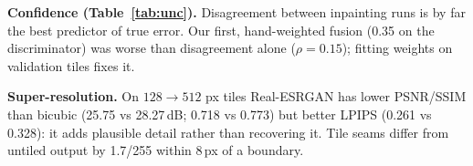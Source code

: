 \documentclass[11pt,a4paper,twocolumn]{article}
\begin{document}
\begin{table}[h]
\centering
\small
{}
\caption{De-fading on 100 simulated faded tiles (lower is better); ``healthy'' = unfaded tiles after the model (ideal 0).}
\label{tab:col}
\end{table}

\textbf{Confidence (Table~\ref{tab:unc}).} Disagreement between inpainting runs is by far the best predictor of true error. Our first, hand-weighted fusion (0.35 on the discriminator) was worse than disagreement alone ($\rho=0.15$); fitting weights on validation tiles fixes it.

\begin{table}[h]
\centering
\small
{}
\caption{Does a signal predict the true repair error (AUROC for error $>25/255$)?}
\label{tab:unc}
\end{table}

\textbf{Super-resolution.} On $128\!\to\!512$ px tiles Real-ESRGAN has lower PSNR/SSIM than bicubic (25.75 vs 28.27\,dB; 0.718 vs 0.773) but better LPIPS (0.261 vs 0.328): it adds plausible detail rather than recovering it. Tile seams differ from untiled output by 1.7/255 within 8\,px of a boundary.
\end{document}
